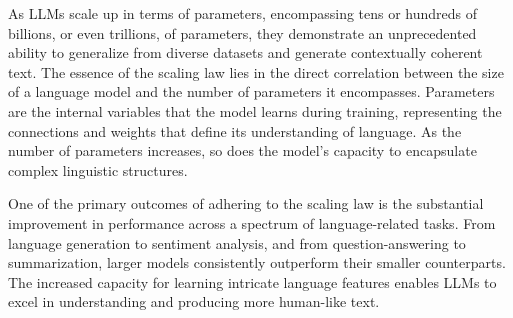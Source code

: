 As LLMs scale up in terms of parameters, encompassing tens or hundreds of billions, or even trillions, of parameters, they demonstrate an unprecedented ability to generalize from diverse datasets and generate contextually coherent text.
The essence of the scaling law lies in the direct correlation between the size of a language model and the number of parameters it encompasses.
Parameters are the internal variables that the model learns during training, representing the connections and weights that define its understanding of language.
As the number of parameters increases, so does the model's capacity to encapsulate complex linguistic structures.

One of the primary outcomes of adhering to the scaling law is the substantial improvement in performance across a spectrum of language-related tasks.
From language generation to sentiment analysis, and from question-answering to summarization, larger models consistently outperform their smaller counterparts.
The increased capacity for learning intricate language features enables LLMs to excel in understanding and producing more human-like text.


